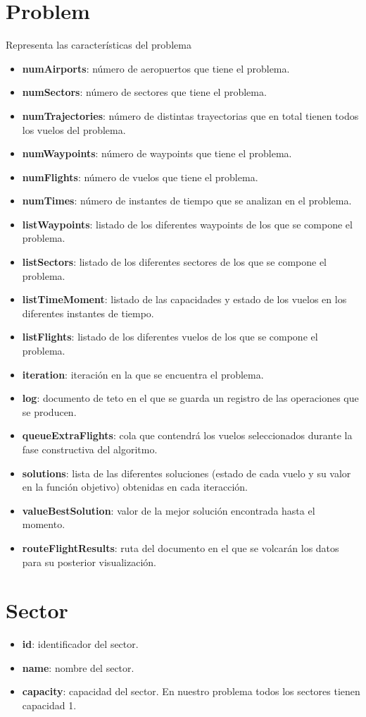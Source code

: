 \section{Problem}
Representa las características del problema
\begin{itemize}
	\item \textbf{numAirports}: número de aeropuertos que tiene el problema.
	\item \textbf{numSectors}: número de sectores que tiene el problema.
	\item \textbf{numTrajectories}: número de distintas trayectorias que en total tienen todos los vuelos del problema.
	\item \textbf{numWaypoints}: número de waypoints que tiene el problema.
	\item \textbf{numFlights}: número de vuelos que tiene el problema.
	\item \textbf{numTimes}: número de instantes de tiempo que se analizan en el problema.
	\item \textbf{listWaypoints}: listado de los diferentes waypoints de los que se compone el problema.
	\item \textbf{listSectors}: listado de los diferentes sectores de los que se compone el problema.
	\item \textbf{listTimeMoment}: listado de las capacidades y estado de los vuelos en los diferentes instantes de tiempo.
	\item \textbf{listFlights}: listado de los diferentes vuelos de los que se compone el problema.
	\item \textbf{iteration}: iteración en la que se encuentra el problema.
	\item \textbf{log}: documento de teto en el que se guarda un registro de las operaciones que se producen.
	\item \textbf{queueExtraFlights}: cola que contendrá los vuelos seleccionados durante la fase constructiva del algoritmo.
	\item \textbf{solutions}: lista de las diferentes soluciones (estado de cada vuelo y su valor en la función objetivo) obtenidas en cada iteracción.
	\item \textbf{valueBestSolution}: valor de la mejor solución encontrada hasta el momento.
	\item \textbf{routeFlightResults}: ruta del documento en el que se volcarán los datos para su posterior visualización.
\end{itemize}

\section{Sector}
\begin{itemize}
	\item \textbf{id}: identificador del sector.
	\item \textbf{name}: nombre del sector.
	\item \textbf{capacity}: capacidad del sector. En nuestro problema todos los sectores tienen capacidad 1.
\end{itemize}

